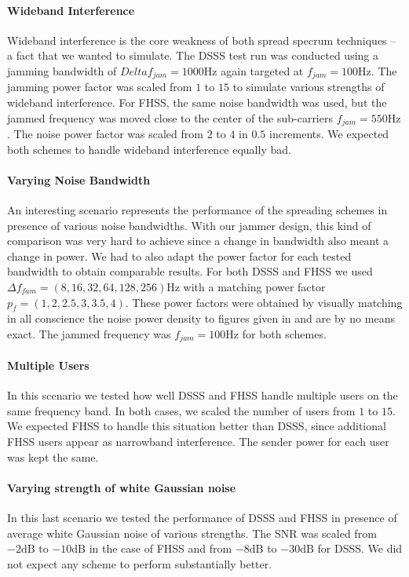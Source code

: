 	\paragraph{Wideband Interference}
	Wideband interference is the core weakness of both spread specrum techniques -- a fact that we wanted to simulate. The DSSS test run was conducted using a jamming bandwidth of $Delta f_{jam} = 1000\text{Hz}$ again targeted at $f_{jam} = 100\text{Hz}$. The jamming power factor was scaled from $1$ to $15$ to simulate various strengths of wideband interference. For FHSS, the same noise bandwidth was used, but the jammed frequency was moved close to the center of the sub-carriers $f_{jam} = 550\text{Hz}$. The noise power factor was scaled from $2$ to $4$ in $0.5$ increments. We expected both schemes to handle wideband interference equally bad.
	
	\paragraph{Varying Noise Bandwidth}	
	An interesting scenario represents the performance of the spreading schemes in presence of various noise bandwidths. With our jammer design, this kind of comparison was very hard to achieve since a change in bandwidth also meant a change in power. We had to also adapt the power factor for each tested bandwidth to obtain comparable results. For both DSSS and FHSS we used $\Delta f_{fam} = (8,16,32,64,128,256)\text{Hz}$ with a matching power factor $p_f = (1,2,2.5,3,3.5,4)$. These power factors were obtained by visually matching in all conscience the noise power density to figures given in \cite{ISS} and are by no means exact. The jammed frequency was $f_{jam}=100\text{Hz}$ for both schemes. 
	
	\paragraph{Multiple Users}
	In this scenario we tested how well DSSS and FHSS handle multiple users on the same frequency band. In both cases, we scaled the number of users from $1$ to $15$. We expected FHSS to handle this situation better than DSSS, since additional FHSS users appear as narrowband interference. The sender power for each user was kept the same.
	
	\paragraph{Varying strength of white Gaussian noise}
	In this last scenario we tested the performance of DSSS and FHSS in presence of average white Gaussian noise of various strengths. The SNR was scaled from $-2\text{dB}$ to $-10\text{dB}$ in the case of FHSS and from $-8\text{dB}$ to $-30\text{dB}$ for DSSS. We did not expect any scheme to perform substantially better.
	
	
	